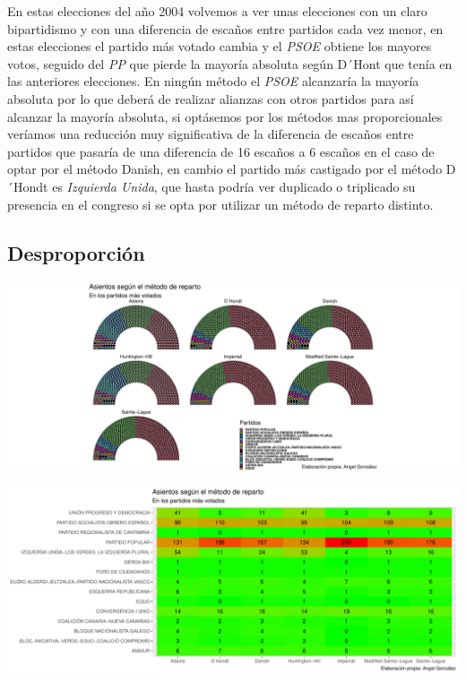\documentclass[12pt,a4paper,]{book}
\numberwithin{dummy}{section}
\theoremstyle{ocrenumbox}
\theoremstyle{blacknumex}
\theoremstyle{blacknumbox}
\theoremstyle{ocrenum}
\theoremstyle{ocrenum}
\begin{document}
En estas elecciones del año 2004 volvemos a ver unas elecciones con un
claro bipartidismo y con una diferencia de escaños entre partidos cada
vez menor, en estas elecciones el partido más votado cambia y el
\emph{PSOE} obtiene los mayores votos, seguido del \emph{PP} que pierde
la mayoría absoluta según D´Hont que tenía en las anteriores elecciones.
En ningún método el \emph{PSOE} alcanzaría la mayoría absoluta por lo
que deberá de realizar alianzas con otros partidos para así alcanzar la
mayoría absoluta, si optásemos por los métodos mas proporcionales
veríamos una reducción muy significativa de la diferencia de escaños
entre partidos que pasaría de una diferencia de 16 escaños a 6 escaños
en el caso de optar por el método Danish, en cambio el partido más
castigado por el método D´Hondt es \emph{Izquierda Unida}, que hasta
podría ver duplicado o triplicado su presencia en el congreso si se opta
por utilizar un método de reparto distinto.

\hypertarget{desproporciuxf3n-8}{%
\subsection{Desproporción}\label{desproporciuxf3n-8}}

\begin{center}\includegraphics[width=1\linewidth]{figurasR/unnamed-chunk-101-1} \end{center}

\begin{center}\includegraphics[width=1\linewidth]{figurasR/unnamed-chunk-101-2} \end{center}
\end{document}
